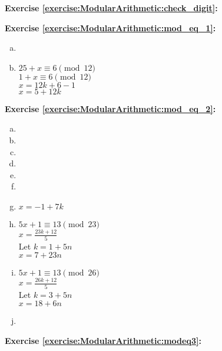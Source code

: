 \noindent\textbf{Exercise \ref{exercise:ModularArithmetic:check_digit}:}

\noindent\textbf{Exercise \ref{exercise:ModularArithmetic:mod_eq_1}:}
\begin{enumerate}[(a)]
\item

\item
$25+x \equiv 6 \pmod{12}$\\
$1+x \equiv 6 \pmod{12}$\\
$x= 12k+6-1$\\
$x=5+12k$
\end{enumerate}

\noindent\textbf{Exercise \ref{exercise:ModularArithmetic:mod_eq_2}:}
\begin{multicols}{2}
\begin{enumerate}[(a)]
\item
\item
\item
\item
\item
\item
\item
$x=-1+7k$

\item
$5x+1 \equiv 13 \pmod{23}$\\
$x= \displaystyle\frac{23k+12}{5}$\\
Let $k=1+5n$\\
$x=7+23n$

\item
$5x+1 \equiv 13 \pmod{26}$\\
$x= \displaystyle\frac{26k+12}{5}$\\
Let $k=3+5n$\\
$x=18+6n$

\item
\end{enumerate}
\end{multicols}

\noindent\textbf{Exercise \ref{exercise:ModularArithmetic:modeq3}:}

